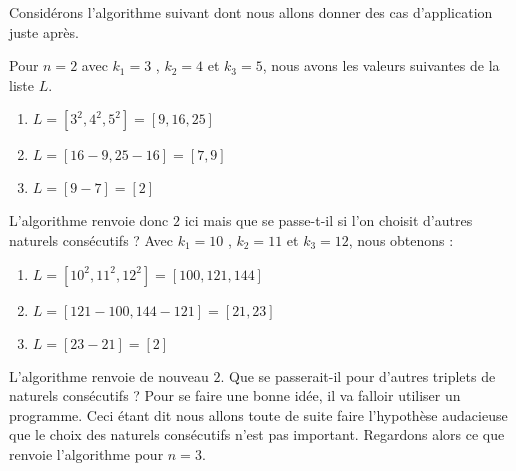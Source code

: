 Considérons l'algorithme suivant dont nous allons donner des cas d'application juste après.

\begin{algo}[
	frame,
	title = Version naturelle
]
	\label{nat-algo}

	
	\BlankLine
	
\end{algo}


Pour $n = 2$ avec $k_1 = 3$ , $k_2 = 4$ et $k_3 = 5$, nous avons les valeurs suivantes de la liste $L$.

\begin{enumerate}
	\item $L = [3^2 , 4^2 , 5^2] = [9 , 16 , 25]$

	\item $L = [16 - 9 , 25 - 16] = [7, 9]$

	\item $L = [9 - 7] = [2]$
\end{enumerate}


L'algorithme renvoie donc $2$ ici mais que se passe-t-il si l'on choisit d'autres naturels consécutifs ? Avec $k_1 = 10$ , $k_2 = 11$ et $k_3 = 12$, nous obtenons :

\begin{enumerate}
	\item $L = [10^2 , 11^2 , 12^2] = [100 , 121 , 144]$

	\item $L = [121 - 100 , 144 - 121] = [21 , 23]$

	\item $L = [23 - 21] = [2]$
\end{enumerate}


L'algorithme renvoie de nouveau $2$. Que se passerait-il pour d'autres triplets de naturels consécutifs ? Pour se faire une bonne idée, il va falloir utiliser un programme. Ceci étant dit nous allons toute de suite faire l'hypothèse audacieuse que le choix des naturels consécutifs n'est pas important. Regardons alors ce que renvoie l'algorithme pour $n = 3$.

